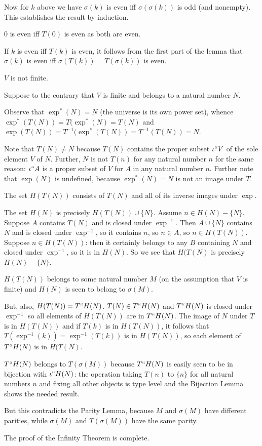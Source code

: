 \documentclass[12pt]{article}
\begin{document}
\begin{description}
Now for $k$ above we have $\sigma(k)$ is even iff $\sigma(\sigma(k))$ is odd (and nonempty).  This establishes the result by induction.

0 is even iff $T(0)$ is even as both are even.

If $k$ is even iff $T(k)$ is even, 
it follows from the first part of the lemma that $\sigma(k)$ is even iff $\sigma(T(k))=T(\sigma(k))$ is even.

\item[Theorem (Infinity):]  $V$ is not finite.

Suppose to the contrary that $V$ is finite and belongs to a natural number $N$.

Observe that $\exp^*(N)=N$ (the universe is its own power set), whence $\exp^*(T(N))=T(\exp^*(N)=T(N)$ and $\exp(T(N))=T^{-1}(\exp^*(T(N))=T^{-1}(T(N))=N$.

Note that $T(N) \neq N$ because $T(N)$ contains the proper subset $\iota``V$ of the sole element $V$ of $N$.  Further, $N$ is not  $T(n)$ for any natural number $n$ for the same reason:  $\iota``A$ is a proper subset of $V$ for $A$ in any natural number $n$.  Further note that $\exp(N)$ is undefined, because $\exp^*(N)=N$ is not an image under $T$.

The set $H(T(N))$ consists of $T(N)$ and all of its inverse images under $\exp$.   

The set $H(N)$ is precisely $H(T(N)) \cup \{N\}$.   Assume $n \in H(N)-\{N\}$.  Suppose $A$ contains $T(N)$ and is closed under $\exp^{-1}$.  Then $A \cup \{N\}$ contains $N$ and is closed under $\exp^{-1}$,
so it contains $n$, so $n \in A$, so $n \in H(T(N))$.   Suppose $n \in H(T(N))$:  then it certainly belongs to any $B$ containing $N$ and closed under $\exp^{-1}$, so it is in $H(N)$.  So we see that
$H(T(N)$ is precisely $H(N)-\{N\}$. 

$H(T(N))$ belongs to some natural number $M$ (on the assumption that $V$ is finite)
and $H(N)$ is seen to belong to $\sigma(M)$.

But, also, $H(T(N)) = T``H(N)$.    $T(N) \in T``H(N)$ and $T``H(N)$ is closed under $\exp^{-1}$ so all elements of $H(T(N))$ are in $T``H(N)$.  The image of $N$ under $T$ is in $H(T(N))$ and if $T(k)$ is in $H(T(N))$, it follows
that $T(\exp^{-1}(k))=\exp^{-1}(T(k))$ is in $H(T(N))$, so each element of $T``H(N)$ is in $H(T(N)$.

$T``H(N)$ belongs to $T(\sigma(M))$ because $T``H(N)$ is easily seen to be in bijection with $\iota``H(N)$:  the operation taking $T(n)$ to $\{n\}$ for all natural numbers $n$ and fixing all other objects is type level and the Bijection Lemma shows the needed result.

But this contradicts the Parity Lemma, because $M$ and $\sigma(M)$ have different parities, while $\sigma(M)$ and $T(\sigma(M))$ have the same parity.

The proof of the Infinity Theorem is complete.
\end{description}
\end{document}
